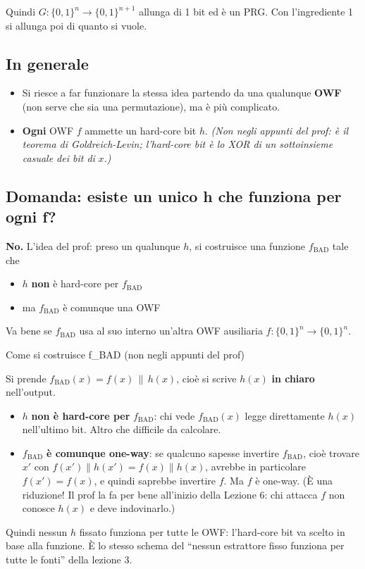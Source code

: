Quindi \(G : \{0,1\}^n \to \{0,1\}^{n+1}\) allunga di 1 bit ed è un PRG. Con l'ingrediente 1 si allunga poi di quanto si vuole.

\subsection{In generale}

\begin{itemize}
\tightlist
\item
  Si riesce a far funzionare la stessa idea partendo da una qualunque \textbf{OWF} (non serve che sia una permutazione), ma è più complicato.
\item
  \textbf{Ogni} OWF \(f\) ammette un hard-core bit \(h\). \emph{(Non negli appunti del prof: è il teorema di Goldreich-Levin; l'hard-core bit è lo XOR di un sottoinsieme casuale dei bit di} \(x\)\emph{.)}
\end{itemize}

\subsection{Domanda: esiste un unico h che funziona per ogni f?}

\textbf{No.} L'idea del prof: preso un qualunque \(h\), si costruisce una funzione \(f_{\text{BAD}}\) tale che

\begin{itemize}
\tightlist
\item
  \(h\) \textbf{non} è hard-core per \(f_{\text{BAD}}\)
\item
  ma \(f_{\text{BAD}}\) è comunque una OWF
\end{itemize}

Va bene se \(f_{\text{BAD}}\) usa al suo interno un'altra OWF ausiliaria \(f : \{0,1\}^n \to \{0,1\}^n\).

\begin{approfondimento}{Come si costruisce f\_BAD (non negli appunti del prof)}

Si prende \(f_{\text{BAD}}(x) = f(x) \,\|\, h(x)\), cioè si scrive \(h(x)\) \textbf{in chiaro} nell'output.

\begin{itemize}
\tightlist
\item
  \(h\) \textbf{non è hard-core per} \(f_{\text{BAD}}\): chi vede \(f_{\text{BAD}}(x)\) legge direttamente \(h(x)\) nell'ultimo bit. Altro che difficile da calcolare.
\item
  \(f_{\text{BAD}}\) \textbf{è comunque one-way}: se qualcuno sapesse invertire \(f_{\text{BAD}}\), cioè trovare \(x'\) con \(f(x') \| h(x') = f(x) \| h(x)\), avrebbe in particolare \(f(x') = f(x)\), e quindi saprebbe invertire \(f\). Ma \(f\) è one-way. (È una riduzione! Il prof la fa per bene all'inizio della Lezione 6: chi attacca \(f\) non conosce \(h(x)\) e deve indovinarlo.)
\end{itemize}

Quindi nessun \(h\) fissato funziona per tutte le OWF: l'hard-core bit va scelto in base alla funzione. È lo stesso schema del ``nessun estrattore fisso funziona per tutte le fonti'' della lezione 3.

\end{approfondimento}

